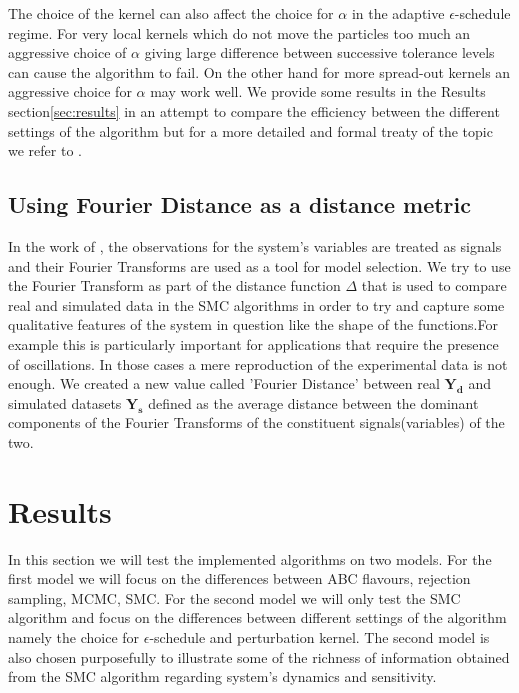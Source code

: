 The choice of the kernel can also affect the choice for $\alpha$ in the adaptive $\epsilon$-schedule regime. For very local kernels which do not move the particles too much an aggressive choice of $\alpha$ giving large difference between successive tolerance levels can cause the algorithm to fail. On the other hand for more spread-out kernels an aggressive choice for $\alpha$ may work well.
We provide some results in the Results section\ref{sec:results} in an attempt to compare the efficiency between the different settings of the algorithm but for a more detailed and formal treaty of the topic we refer to \cite[] {filippi2011optimal}. 
\subsection{Using Fourier Distance as a distance metric}
\label{sec:fourier}
In the work of \cite[] {konopka2010gene}, the observations for the system's variables are treated as signals and their Fourier Transforms are used as a tool for model selection. We try to use the Fourier Transform as part of the distance function $\Delta$ that is used to compare real and simulated data in the SMC algorithms in order to try and capture some qualitative features of the system in question like the shape of the functions.For example this is particularly important for applications that require the presence of oscillations. In those cases a mere reproduction of the experimental data is not enough. We created a new value called 'Fourier Distance' between real $\mathbf{Y_{d}}$ and simulated datasets $\mathbf{Y_{s}}$ defined as the average distance between the dominant components of the Fourier Transforms of the constituent signals(variables) of the two.

\section{Results}
In this section we will test the implemented algorithms on two models. For the first model we will focus on the differences between ABC flavours, rejection sampling, MCMC, SMC. For the second model we will only test the SMC algorithm and focus on the differences between different settings of the algorithm namely the choice for $\epsilon$-schedule and perturbation kernel. The second model is also chosen purposefully to illustrate some of the richness of information obtained from the SMC algorithm regarding system's dynamics and sensitivity.

